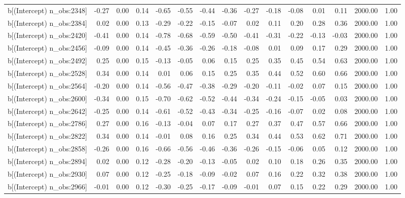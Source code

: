 \begin{table}[ht]
\begin{tabular}{rrrrrrrrrrrrrrr}
  b[(Intercept) n\_obs:2348] & -0.27 & 0.00 & 0.14 & -0.65 & -0.55 & -0.44 & -0.36 & -0.27 & -0.18 & -0.08 & 0.01 & 0.11 & 2000.00 & 1.00 \\ 
  b[(Intercept) n\_obs:2384] & 0.02 & 0.00 & 0.13 & -0.29 & -0.22 & -0.15 & -0.07 & 0.02 & 0.11 & 0.20 & 0.28 & 0.36 & 2000.00 & 1.00 \\ 
  b[(Intercept) n\_obs:2420] & -0.41 & 0.00 & 0.14 & -0.78 & -0.68 & -0.59 & -0.50 & -0.41 & -0.31 & -0.22 & -0.13 & -0.03 & 2000.00 & 1.00 \\ 
  b[(Intercept) n\_obs:2456] & -0.09 & 0.00 & 0.14 & -0.45 & -0.36 & -0.26 & -0.18 & -0.08 & 0.01 & 0.09 & 0.17 & 0.29 & 2000.00 & 1.00 \\ 
  b[(Intercept) n\_obs:2492] & 0.25 & 0.00 & 0.15 & -0.13 & -0.05 & 0.06 & 0.15 & 0.25 & 0.35 & 0.45 & 0.54 & 0.63 & 2000.00 & 1.00 \\ 
  b[(Intercept) n\_obs:2528] & 0.34 & 0.00 & 0.14 & 0.01 & 0.06 & 0.15 & 0.25 & 0.35 & 0.44 & 0.52 & 0.60 & 0.66 & 2000.00 & 1.00 \\ 
  b[(Intercept) n\_obs:2564] & -0.20 & 0.00 & 0.14 & -0.56 & -0.47 & -0.38 & -0.29 & -0.20 & -0.11 & -0.02 & 0.07 & 0.15 & 2000.00 & 1.00 \\ 
  b[(Intercept) n\_obs:2600] & -0.34 & 0.00 & 0.15 & -0.70 & -0.62 & -0.52 & -0.44 & -0.34 & -0.24 & -0.15 & -0.05 & 0.03 & 2000.00 & 1.00 \\ 
  b[(Intercept) n\_obs:2642] & -0.25 & 0.00 & 0.14 & -0.61 & -0.52 & -0.43 & -0.34 & -0.25 & -0.16 & -0.07 & 0.02 & 0.08 & 2000.00 & 1.00 \\ 
  b[(Intercept) n\_obs:2786] & 0.27 & 0.00 & 0.16 & -0.13 & -0.04 & 0.07 & 0.17 & 0.27 & 0.37 & 0.47 & 0.57 & 0.66 & 2000.00 & 1.00 \\ 
  b[(Intercept) n\_obs:2822] & 0.34 & 0.00 & 0.14 & -0.01 & 0.08 & 0.16 & 0.25 & 0.34 & 0.44 & 0.53 & 0.62 & 0.71 & 2000.00 & 1.00 \\ 
  b[(Intercept) n\_obs:2858] & -0.26 & 0.00 & 0.16 & -0.66 & -0.56 & -0.46 & -0.36 & -0.26 & -0.15 & -0.06 & 0.05 & 0.12 & 2000.00 & 1.00 \\ 
  b[(Intercept) n\_obs:2894] & 0.02 & 0.00 & 0.12 & -0.28 & -0.20 & -0.13 & -0.05 & 0.02 & 0.10 & 0.18 & 0.26 & 0.35 & 2000.00 & 1.00 \\ 
  b[(Intercept) n\_obs:2930] & 0.07 & 0.00 & 0.12 & -0.25 & -0.18 & -0.09 & -0.02 & 0.07 & 0.16 & 0.22 & 0.32 & 0.38 & 2000.00 & 1.00 \\ 
  b[(Intercept) n\_obs:2966] & -0.01 & 0.00 & 0.12 & -0.30 & -0.25 & -0.17 & -0.09 & -0.01 & 0.07 & 0.15 & 0.22 & 0.29 & 2000.00 & 1.00 \\ 

\end{tabular}
\end{table}

